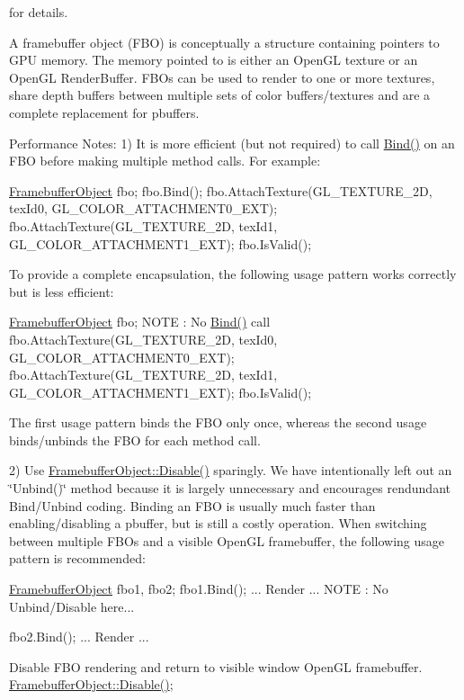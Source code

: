 for details.

A framebuffer object (FBO) is conceptually a structure containing pointers to GPU memory. The memory pointed to is either an OpenGL texture or an OpenGL RenderBuffer. FBOs can be used to render to one or more textures, share depth buffers between multiple sets of color buffers/textures and are a complete replacement for pbuffers.

Performance Notes: 1) It is more efficient (but not required) to call \hyperlink{class_framebuffer_object_a1916acbbe9aafb8302dc117a7cce6fcd}{Bind()} on an FBO before making multiple method calls. For example:

\hyperlink{class_framebuffer_object}{FramebufferObject} fbo; fbo.Bind(); fbo.AttachTexture(GL\_\-TEXTURE\_\-2D, texId0, GL\_\-COLOR\_\-ATTACHMENT0\_\-EXT); fbo.AttachTexture(GL\_\-TEXTURE\_\-2D, texId1, GL\_\-COLOR\_\-ATTACHMENT1\_\-EXT); fbo.IsValid();

To provide a complete encapsulation, the following usage pattern works correctly but is less efficient:

\hyperlink{class_framebuffer_object}{FramebufferObject} fbo; NOTE : No \hyperlink{class_framebuffer_object_a1916acbbe9aafb8302dc117a7cce6fcd}{Bind()} call fbo.AttachTexture(GL\_\-TEXTURE\_\-2D, texId0, GL\_\-COLOR\_\-ATTACHMENT0\_\-EXT); fbo.AttachTexture(GL\_\-TEXTURE\_\-2D, texId1, GL\_\-COLOR\_\-ATTACHMENT1\_\-EXT); fbo.IsValid();

The first usage pattern binds the FBO only once, whereas the second usage binds/unbinds the FBO for each method call.

2) Use \hyperlink{class_framebuffer_object_ae327450680f21e18893c3657b8635bf3}{FramebufferObject::Disable()} sparingly. We have intentionally left out an \char`\"{}Unbind()\char`\"{} method because it is largely unnecessary and encourages rendundant Bind/Unbind coding. Binding an FBO is usually much faster than enabling/disabling a pbuffer, but is still a costly operation. When switching between multiple FBOs and a visible OpenGL framebuffer, the following usage pattern is recommended:

\hyperlink{class_framebuffer_object}{FramebufferObject} fbo1, fbo2; fbo1.Bind(); ... Render ... NOTE : No Unbind/Disable here...

fbo2.Bind(); ... Render ...

Disable FBO rendering and return to visible window OpenGL framebuffer. \hyperlink{class_framebuffer_object_ae327450680f21e18893c3657b8635bf3}{FramebufferObject::Disable()}; 

